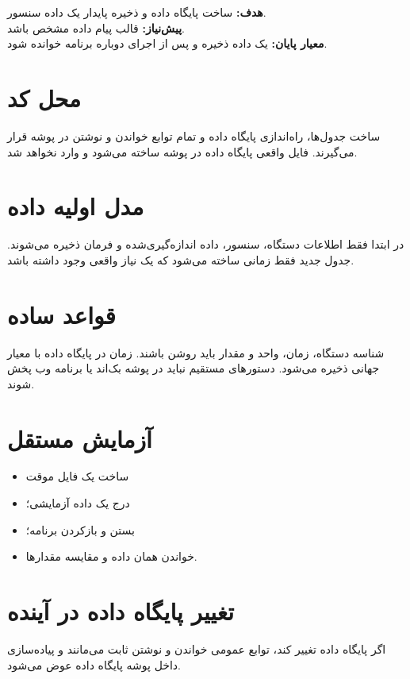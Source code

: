 \begin{phasebox}
\textbf{هدف:} ساخت پایگاه داده و ذخیره پایدار یک داده سنسور.\\
\textbf{پیش‌نیاز:} قالب پیام داده مشخص باشد.\\
\textbf{معیار پایان:} یک داده ذخیره و پس از اجرای دوباره برنامه خوانده شود.
\end{phasebox}

\section{محل کد}
ساخت جدول‌ها، راه‌اندازی پایگاه داده و تمام توابع خواندن و نوشتن در پوشه
قرار می‌گیرند. فایل واقعی پایگاه داده در پوشه
ساخته می‌شود و وارد
نخواهد شد.

\section{مدل اولیه داده}
در ابتدا فقط اطلاعات دستگاه، سنسور، داده اندازه‌گیری‌شده و فرمان ذخیره می‌شوند. جدول جدید فقط زمانی ساخته می‌شود که یک نیاز واقعی وجود داشته باشد.

\section{قواعد ساده}
شناسه دستگاه، زمان، واحد و مقدار باید روشن باشند. زمان در پایگاه داده با معیار جهانی ذخیره می‌شود. دستورهای مستقیم
نباید در پوشه بک‌اند یا برنامه وب پخش شوند.

\section{آزمایش مستقل}
\begin{itemize}
    \item ساخت یک فایل موقت
    \item درج یک داده آزمایشی؛
    \item بستن و بازکردن برنامه؛
    \item خواندن همان داده و مقایسه مقدارها.
\end{itemize}

\section{تغییر پایگاه داده در آینده}
اگر پایگاه داده تغییر کند، توابع عمومی خواندن و نوشتن ثابت می‌مانند و پیاده‌سازی داخل پوشه پایگاه داده عوض می‌شود.
